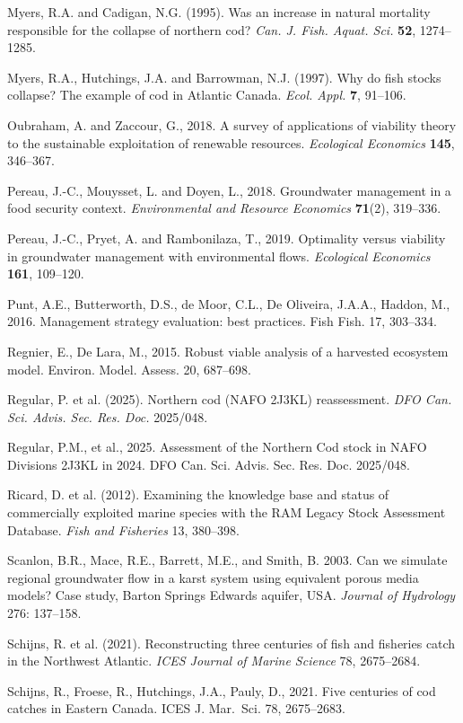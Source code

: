Myers, R.A. and Cadigan, N.G. (1995). Was an increase in natural mortality responsible for
the collapse of northern cod? \emph{Can. J. Fish. Aquat. Sci.} \textbf{52}, 1274--1285.

Myers, R.A., Hutchings, J.A. and Barrowman, N.J. (1997). Why do fish stocks collapse? The
example of cod in Atlantic Canada. \emph{Ecol. Appl.} \textbf{7}, 91--106.

Oubraham, A. and Zaccour, G., 2018. A survey of applications of viability theory to the
sustainable exploitation of renewable resources. \emph{Ecological Economics} \textbf{145},
346--367.

Pereau, J.-C., Mouysset, L. and Doyen, L., 2018. Groundwater management in a food security
context. \emph{Environmental and Resource Economics} \textbf{71}(2), 319--336.

Pereau, J.-C., Pryet, A. and Rambonilaza, T., 2019. Optimality versus viability in groundwater
management with environmental flows. \emph{Ecological Economics} \textbf{161}, 109--120.

Punt, A.E., Butterworth, D.S., de Moor, C.L., De Oliveira, J.A.A., Haddon, M., 2016.
Management strategy evaluation: best practices. Fish Fish. 17, 303--334.

Regnier, E., De Lara, M., 2015. Robust viable analysis of a harvested ecosystem model.
Environ. Model. Assess. 20, 687--698.

Regular, P. et al. (2025). Northern cod (NAFO 2J3KL) reassessment.
\emph{DFO Can. Sci. Advis. Sec. Res. Doc.} 2025/048.

Regular, P.M., et al., 2025. Assessment of the Northern Cod stock in
NAFO Divisions 2J3KL in 2024. DFO Can. Sci. Advis. Sec. Res. Doc.
2025/048.

Ricard, D. et al. (2012). Examining the knowledge base and status of
commercially exploited marine species with the RAM Legacy Stock
Assessment Database. \emph{Fish and Fisheries} 13, 380--398.

Scanlon, B.R., Mace, R.E., Barrett, M.E., and Smith, B. 2003. Can we
simulate regional groundwater flow in a karst system using equivalent
porous media models? Case study, Barton Springs Edwards aquifer, USA.
\emph{Journal of Hydrology} 276: 137--158.

Schijns, R. et al. (2021). Reconstructing three centuries of fish and
fisheries catch in the Northwest Atlantic. \emph{ICES Journal of Marine
Science} 78, 2675--2684.

Schijns, R., Froese, R., Hutchings, J.A., Pauly, D., 2021.
Five centuries of cod catches in Eastern Canada. ICES J. Mar.~Sci. 78,
2675--2683.

